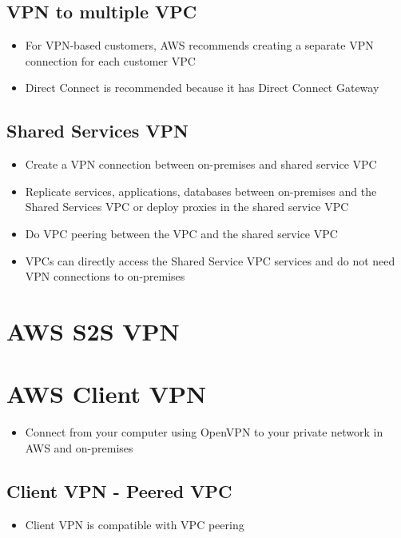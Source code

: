\subsection{VPN to multiple VPC}
\begin{itemize}
    \item For VPN-based customers, AWS recommends creating a separate VPN connection for each customer VPC
    \item Direct Connect is recommended because it has Direct Connect Gateway
\end{itemize}

\subsection{Shared Services VPN}
\begin{itemize}
    \item Create a VPN connection between on-premises and shared service VPC
    \item Replicate services, applications, databases between on-premises and the Shared Services VPC or deploy proxies in the shared service VPC
    \item Do VPC peering between the VPC and the shared service VPC
    \item VPCs can directly access the Shared Service VPC services and do not need VPN connections to on-premises
\end{itemize}


\section{AWS S2S VPN}


\section{AWS Client VPN}
\begin{itemize}
    \item Connect from your computer using OpenVPN to your private network in AWS and on-premises
\end{itemize}

\subsection{Client VPN - Peered VPC}
\begin{itemize}
    \item Client VPN is compatible with VPC peering
\end{itemize}

